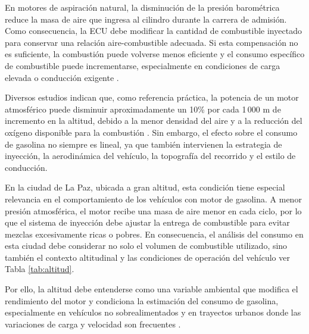 En motores de aspiración natural, la disminución de la presión barométrica reduce la masa de aire que ingresa al cilindro durante la carrera de admisión. Como consecuencia, la ECU debe modificar la cantidad de combustible inyectado para conservar una relación aire-combustible adecuada. Si esta compensación no es suficiente, la combustión puede volverse menos eficiente y el consumo específico de combustible puede incrementarse, especialmente en condiciones de carga elevada o conducción exigente \citep{LopezRuano2018}.

Diversos estudios indican que, como referencia práctica, la potencia de un motor atmosférico puede disminuir aproximadamente un 10\% por cada 1\,000 m de incremento en la altitud, debido a la menor densidad del aire y a la reducción del oxígeno disponible para la combustión \citep{LopezRuano2018}. Sin embargo, el efecto sobre el consumo de gasolina no siempre es lineal, ya que también intervienen la estrategia de inyección, la aerodinámica del vehículo, la topografía del recorrido y el estilo de conducción.

En la ciudad de La Paz, ubicada a gran altitud, esta condición tiene especial relevancia en el comportamiento de los vehículos con motor de gasolina. A menor presión atmosférica, el motor recibe una masa de aire menor en cada ciclo, por lo que el sistema de inyección debe ajustar la entrega de combustible para evitar mezclas excesivamente ricas o pobres. En consecuencia, el análisis del consumo en esta ciudad debe considerar no solo el volumen de combustible utilizado, sino también el contexto altitudinal y las condiciones de operación del vehículo \citep{LopezRuano2018, ANH2014} ver Tabla \ref{tab:altitud}.

Por ello, la altitud debe entenderse como una variable ambiental que modifica el rendimiento del motor y condiciona la estimación del consumo de gasolina, especialmente en vehículos no sobrealimentados y en trayectos urbanos donde las variaciones de carga y velocidad son frecuentes .

